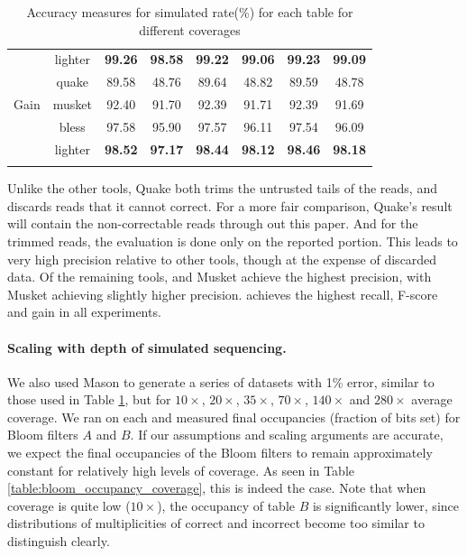 \documentclass{bmcart}
\begin{document}
\begin{table}
{\begin{tabular}{|c|c|c|c|c|c|c|c|}
	& lighter	& \textbf{99.26}	& \textbf{98.58}	& \textbf{99.22}	& \textbf{99.06}	& \textbf{99.23}	& \textbf{99.09} \\ \hhline{|=|=|=|=|=|=|=|=|}
	& quake	& 89.58	& 48.76	& 89.64	& 48.82	& 89.59	& 48.78 \\ \cline{2-8}
Gain	& musket	& 92.40	& 91.70	& 92.39	& 91.71	& 92.39	& 91.69 \\ \cline{2-8}
	& bless	& 97.58	& 95.90	& 97.57	& 96.11	& 97.54	& 96.09 \\ \cline{2-8}
	& lighter	& \textbf{98.52}	& \textbf{97.17}	& \textbf{98.44}	& \textbf{98.12}	& \textbf{98.46}	& \textbf{98.18} \\ \hhline{|=|=|=|=|=|=|=|=|}

\end{tabular}
}
\caption{Accuracy measures for simulated  rate(\%) for each table for different coverages\label{table:accuracy}}
\end{table}

Unlike the other tools, Quake both trims the untrusted tails of the reads, and discards reads that it cannot correct. For a more fair comparison, Quake's result will contain the non-correctable reads through out this paper. And for the trimmed reads, the evaluation is done only on the reported portion. This leads to very high precision relative to other tools, though at the expense of discarded data.  Of the remaining tools, \tool and Musket achieve the highest precision, with Musket achieving slightly higher precision.  \tool achieves the highest recall, F-score and gain in all experiments.

\paragraph{Scaling with depth of simulated sequencing.} We also used Mason to generate a series of datasets with 1\% error, similar to those used in Table \ref{table:accuracy}, but for $10\times$, $20\times$, $35\times$, $70\times$, $140\times$ and $280\times$ average coverage.  We ran \tool on each and measured final occupancies (fraction of bits set) for Bloom filters $A$ and $B$.  If our assumptions and scaling arguments are accurate, we expect the final occupancies of the Bloom filters to remain approximately constant for relatively high levels of coverage.  As seen in Table \ref{table:bloom_occupancy_coverage}, this is indeed the case.  Note that when coverage is quite low ($10\times$), the occupancy of table $B$ is significantly lower, since distributions of multiplicities of correct and incorrect \kmers become too similar to distinguish clearly.
\end{document}
